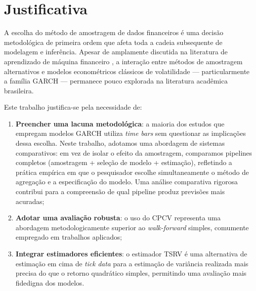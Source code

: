 \section{Justificativa}
\label{sec:justificativa}

A escolha do método de amostragem de dados financeiros é uma decisão
metodológica de primeira ordem que afeta toda a cadeia subsequente de
modelagem e inferência. Apesar de amplamente discutida na literatura de
aprendizado de máquina financeiro \cite{lopez2018advances}, a interação
entre métodos de amostragem alternativos e modelos econométricos clássicos
de volatilidade --- particularmente a família GARCH --- permanece pouco
explorada na literatura acadêmica brasileira.

Este trabalho justifica-se pela necessidade de:

\begin{enumerate}
    \item \textbf{Preencher uma lacuna metodológica}: a maioria dos estudos
          que empregam modelos GARCH utiliza \emph{time bars} sem questionar
          as implicações dessa escolha. Neste trabalho, adotamos uma
          abordagem de sistemas comparativos: em vez de isolar o efeito da
          amostragem, comparamos pipelines completos (amostragem + seleção
          de modelo + estimação), refletindo a prática empírica em que o
          pesquisador escolhe simultaneamente o método de agregação e a
          especificação do modelo. Uma análise comparativa rigorosa
          contribui para a compreensão de qual pipeline produz previsões
          mais acuradas;
    \item \textbf{Adotar uma avaliação robusta}: o uso do CPCV representa
          uma abordagem metodologicamente superior ao \emph{walk-forward}
          simples, comumente empregado em trabalhos aplicados;
    \item \textbf{Integrar estimadores eficientes}: o estimador TSRV é uma
          alternativa de estimação em cima de \emph{tick data} para a
          estimação de variância realizada mais precisa do que o retorno
          quadrático simples, permitindo uma avaliação mais fidedigna dos
          modelos.
\end{enumerate}